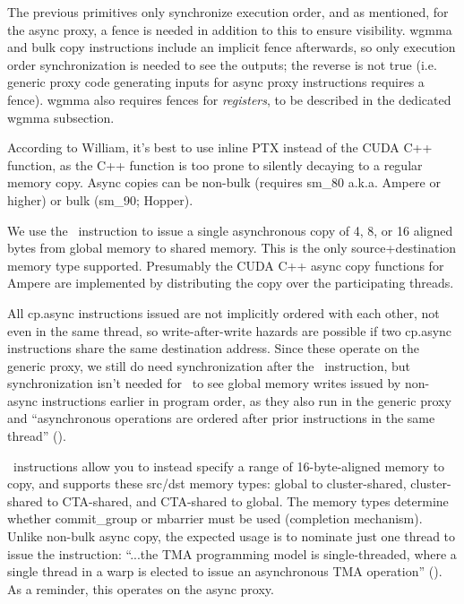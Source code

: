 \filbreak
{} The previous primitives only synchronize execution order, and as mentioned, for the async proxy, a fence is needed in addition to this to ensure visibility.
wgmma and bulk copy instructions include an implicit fence afterwards, so only execution order synchronization is needed to see the outputs; the reverse is not true (i.e. generic proxy code generating inputs for async proxy instructions requires a fence).
wgmma also requires fences for \textit{registers}, to be described in the dedicated wgmma subsection.

\filbreak
{}

According to William, it's best to use inline PTX instead of the CUDA C++  function, as the C++ function is too prone to silently decaying to a regular memory copy. Async copies can be non-bulk (requires sm\_80 a.k.a. Ampere or higher) or bulk (sm\_90; Hopper).

\filbreak
{} We use the \cpAsync\ instruction to issue a single asynchronous copy of 4, 8, or 16 aligned bytes from global memory to shared memory. This is the only source+destination memory type supported. Presumably the CUDA C++ async copy functions for Ampere are implemented by distributing the copy over the participating threads.

All cp.async instructions issued are not implicitly ordered with each other, not even in the same thread, so write-after-write hazards are possible if two cp.async instructions share the same destination address. Since these operate on the generic proxy, we still do need synchronization after the \cpAsync\ instruction, but synchronization isn't needed for \cpAsync\ to see global memory writes issued by non-async instructions earlier in program order, as they also run in the generic proxy and ``asynchronous operations are ordered after prior instructions in the same thread'' ().

\filbreak
{} \cpAsyncBulk\ instructions allow you to instead specify a range of 16-byte-aligned memory to copy, and supports these src/dst memory types: global to cluster-shared, cluster-shared to CTA-shared, and CTA-shared to global. The memory types determine whether commit\_group or mbarrier must be used (completion mechanism). Unlike non-bulk async copy, the expected usage is to nominate just one thread to issue the instruction: ``...the TMA programming model is single-threaded, where a single thread in a warp is elected to issue an asynchronous TMA operation'' (\hopperBlog). As a reminder, this operates on the async proxy.

